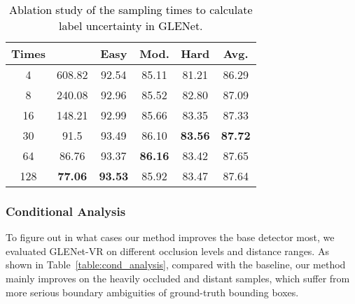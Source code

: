 \documentclass[twocolumn]{svjour3}
\newcommand{\revise}[1]{\textcolor{black}{#1}}
\begin{document}
\setlength{\tabcolsep}{7pt}
\begin{table}
	\centering
	\caption{\revise{Ablation study of the sampling times to calculate label uncertainty in GLENet.}}
	\label{table:ablation_sampling_times}
	\begin{tabular}{c|c|cccc} 
		\toprule
		Times &  & Easy  & Mod.  & Hard  & Avg.   \\ 
		\hline
		4   & 608.82 & 92.54 & 85.11 & 81.21 & 86.29  \\
		8   & 240.08 & 92.96 & 85.52 & 82.80 & 87.09  \\
		16  & 148.21 & 92.99 & 85.66 & 83.35 & 87.33  \\
		30  & 91.5   & 93.49 & 86.10 & \textbf{83.56} & \textbf{87.72}  \\
		64  & 86.76  & 93.37 & \textbf{86.16} & 83.42 & 87.65  \\
		128 & \textbf{77.06}  & \textbf{93.53} & 85.92 & 83.47 & 87.64  \\
		\bottomrule
	\end{tabular}
\end{table}
\setlength{\tabcolsep}{1.5pt}


\subsubsection{Conditional Analysis}\label{con_analysis}
To figure out in what cases our method improves the base detector most, we evaluated GLENet-VR on different occlusion levels and distance ranges. As shown in Table~\ref{table:cond_analysis}, compared with the baseline, our method mainly improves on the heavily occluded and distant samples, which suffer from more serious boundary ambiguities of ground-truth bounding boxes. 
\end{document}
